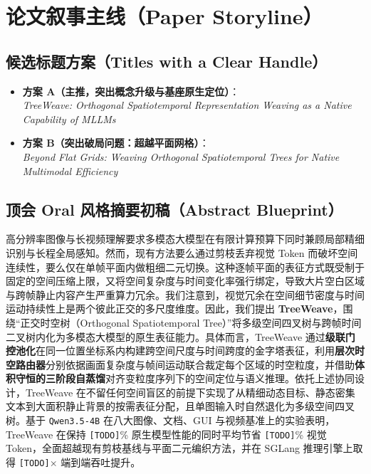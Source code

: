 \documentclass[11pt,a4paper]{ctexart}
\newcommand{\TODO}{\textcolor{MutedGray}{\texttt{[TODO]}}}
\begin{document}
\section{论文叙事主线（Paper Storyline）}

\subsection{候选标题方案（Titles with a Clear Handle）}
\begin{itemize}[leftmargin=1.5em, itemsep=2pt]
  \item \textbf{方案 A（主推，突出概念升级与基座原生定位）}：\\
  \textit{TreeWeave: Orthogonal Spatiotemporal Representation Weaving as a Native Capability of MLLMs}
  \item \textbf{方案 B（突出破局问题：超越平面网格）}：\\
  \textit{Beyond Flat Grids: Weaving Orthogonal Spatiotemporal Trees for Native Multimodal Efficiency}
\end{itemize}

\subsection{顶会 Oral 风格摘要初稿（Abstract Blueprint）}
\begin{storybox}
高分辨率图像与长视频理解要求多模态大模型在有限计算预算下同时兼顾局部精细识别与长程全局感知。然而，现有方法要么通过剪枝丢弃视觉 Token 而破坏空间连续性，要么仅在单帧平面内做粗细二元切换。这种逐帧平面的表征方式既受制于固定的空间压缩上限，又将空间复杂度与时间变化率强行绑定，导致大片空白区域与跨帧静止内容产生严重算力冗余。我们注意到，视觉冗余在空间细节密度与时间运动持续性上是两个彼此正交的多尺度维度。因此，我们提出 \textbf{TreeWeave}，围绕``正交时空树（Orthogonal Spatiotemporal Tree）''将多级空间四叉树与跨帧时间二叉树内化为多模态大模型的原生表征能力。具体而言，TreeWeave 通过\textbf{级联门控池化}在同一位置坐标系内构建跨空间尺度与时间跨度的金字塔表征，利用\textbf{层次时空路由器}分别依据画面复杂度与帧间运动联合裁定每个区域的时空粒度，并借助\textbf{体积守恒的三阶段自蒸馏}对齐变粒度序列下的空间定位与语义推理。依托上述协同设计，TreeWeave 在不留任何空间盲区的前提下实现了从精细动态目标、静态密集文本到大面积静止背景的按需表征分配，且单图输入时自然退化为多级空间四叉树。基于 \texttt{Qwen3.5-4B} 在八大图像、文档、GUI 与视频基准上的实验表明，TreeWeave 在保持 \TODO\% 原生模型性能的同时平均节省 \TODO\% 视觉 Token，全面超越现有剪枝基线与平面二元编织方法，并在 SGLang 推理引擎上取得 \TODO$\times$ 端到端吞吐提升。
\end{storybox}
\end{document}
